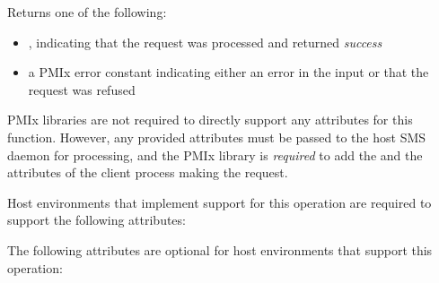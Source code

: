 \begin{arglist}
\end{arglist}

Returns one of the following:

\begin{itemize}
    \item {}, indicating that the request was processed and returned \textit{success}
    \item a PMIx error constant indicating either an error in the input or that the request was refused
\end{itemize}

\reqattrstart
\ac{PMIx} libraries are not required to directly support any attributes for this function. However, any provided attributes must be passed to the host \ac{SMS} daemon for processing, and the \ac{PMIx} library is \textit{required} to add the  and the  attributes of the client process making the request.

\divider

Host environments that implement support for this operation are required to support the following attributes:


\reqattrend

\optattrstart
The following attributes are optional for host environments that support this operation:


